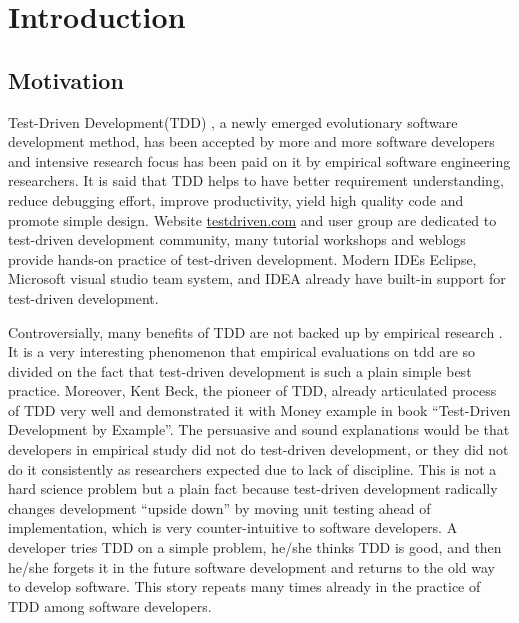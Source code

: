 \chapter{Introduction}
\label{chap:Intro}

\section{Motivation}
\label{sec:motivation}
Test-Driven Development(TDD) \cite{Beck:03,Astels:03}, a newly emerged
evolutionary software development method, has been accepted by more and
more software developers and intensive research focus has been paid on it
by empirical software engineering researchers. It is said that TDD helps to
have better requirement understanding, reduce debugging effort, improve
productivity, yield high quality code and promote simple
design\cite{Beck:03,George:03,Maximilien:03,Kaufmann:03}. Website
\url{testdriven.com} and user group \cite{TddYahooGroup} are dedicated to
test-driven development community, many tutorial
workshops\cite{OsheroveWorkshop:04,ClarkwareWorkshop:04,AdaptionTddWorkshop,IndustrialLogicTddWorkshop}
and
weblogs\cite{TestDrivenDotComWeblogs,GaryPollice:03,MemoRandaBlog,EichertBlog,MasonBlog}
provide hands-on practice of test-driven development. Modern IDEs Eclipse,
Microsoft visual studio team system, and IDEA already have built-in support
for test-driven development.

Controversially, many benefits of TDD are not backed up by empirical
research \cite{Muller:02,Muller:03,Geras:04}. It is a very interesting
phenomenon that empirical evaluations on tdd are so divided on the fact
that test-driven development is such a plain simple best practice.
Moreover, Kent Beck, the pioneer of TDD, already articulated process of TDD
very well and demonstrated it with Money example in book ``Test-Driven
Development by Example''\cite{Beck:03}.  The persuasive and sound
explanations would be that developers in empirical study did not do
test-driven development, or they did not do it consistently as researchers
expected due to lack of discipline. This is not a hard science problem but
a plain fact because test-driven development radically changes development
``upside down''\cite{Pipka:03} by moving unit testing ahead of
implementation, which is very counter-intuitive to software developers. A
developer tries TDD on a simple problem, he/she thinks TDD is good, and
then he/she forgets it in the future software development and returns to
the old way to develop software.  This story repeats many times already in
the practice of TDD among software developers.

